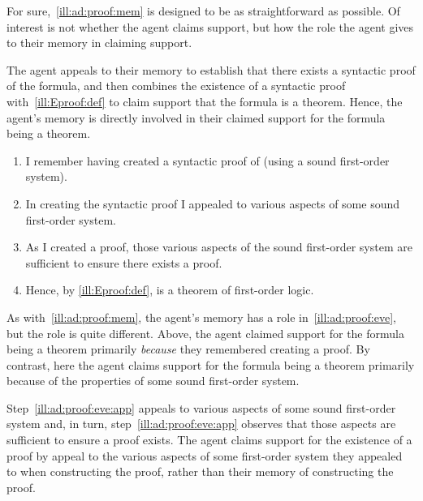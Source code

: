 \begin{note}[Memory]
  For sure,~\autoref{ill:ad:proof:mem} is designed to be as straightforward as possible.
  Of interest is not whether the agent claims support, but how the role the agent gives to their memory in claiming support.

  The agent appeals to their memory to establish that there exists a syntactic proof of the formula, and then combines the existence of a syntactic proof with~\ref{ill:Eproof:def} to claim support that the formula is a theorem.
  Hence, the agent's memory is directly involved in their claimed support for the formula being a theorem.
\end{note}


\begin{note}
  \begin{illustration}\label{ill:ad:proof:eve}
    \mbox{}
    \vspace{-\baselineskip}
    \begin{enumerate}
    \item I remember having created a syntactic proof of  (using a sound first-order system).
    \item\label{ill:ad:proof:eve:app} In creating the syntactic proof I appealed to various aspects of some sound first-order system.
    \item\label{ill:ad:proof:eve:pos} As I created a proof, those various aspects of the sound first-order system are sufficient to ensure there exists a proof.
    \item Hence, by \ref{ill:Eproof:def},  is a theorem of first-order logic.
    \end{enumerate}
    \vspace{-\baselineskip}
  \end{illustration}

  As with~\autoref{ill:ad:proof:mem}, the agent's memory has a role in~\autoref{ill:ad:proof:eve}, but the role is quite different.
  Above, the agent claimed support for the formula being a theorem primarily \emph{because} they remembered creating a proof.
  By contrast, here the agent claims support for the formula being a theorem primarily because of the properties of some sound first-order system.

  Step~\ref{ill:ad:proof:eve:app} appeals to various aspects of some sound first-order system and, in turn, step~\ref{ill:ad:proof:eve:app} observes that those aspects are sufficient to ensure a proof exists.
  The agent claims support for the existence of a proof by appeal to the various aspects of some first-order system they appealed to when constructing the proof, rather than their memory of constructing the proof.
\end{note}

